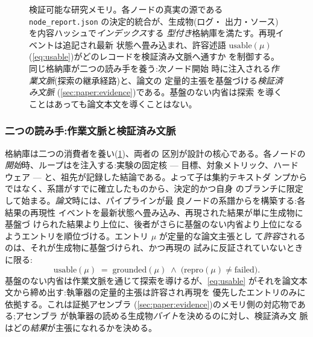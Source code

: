 \begin{figure}[t]
  \centering
  \resizebox{0.92\columnwidth}{!}{}
  \caption{検証可能な研究メモリ。各ノードの真実の源である
           \texttt{node\_report.json} の決定的統合が、生成物(ログ・
           出力・ソース)を内容ハッシュで\emph{インデックス}する
           \emph{型付き}格納庫を満たす。再現イベントは追記され最新
           状態へ畳み込まれ、許容述語 $\mathrm{usable}(\mu)$
           (\cref{eq:usable})がどのレコードを検証済み文脈へ通すか
           を制御する。同じ格納庫が二つの読み手を養う:次ノード開始
           時に注入される\emph{作業文脈}(探索の継承経路)と、論文の
           定量的主張を基盤づける\emph{検証済み文脈}
           (\cref{sec:paper:evidence})である。基盤のない内省は探索
           を導くことはあっても論文本文を導くことはない。}
  \label{fig:research-memory}
\end{figure}

\subsubsection*{二つの読み手:作業文脈と検証済み文脈}

格納庫は二つの消費者を養い(\cref{fig:research-memory})、両者の
区別が設計の核心である。各ノードの\emph{開始}時、ループはを注入する:実験の固定核 — 目標、対象メトリック、ハード
ウェア — と、祖先が記録した結論である。よって子は集約テキストダ
ンプからではなく、系譜がすでに確立したものから、決定的かつ自身
のブランチに限定して始まる。\emph{論文}時には、パイプラインが最
良ノードの系譜からを構築する:各結果の再現性
イベントを最新状態へ畳み込み、再現された結果が単に生成物に基盤づ
けられた結果より上位に、後者がさらに基盤のない内省より上位になる
ようエントリを順位づける。エントリ $\mu$ が定量的な論文主張とし
て\emph{許容}されるのは、それが生成物に基盤づけられ、かつ再現の
試みに反証されていないときに限る:
\begin{equation}\label{eq:usable}
  \mathrm{usable}(\mu) \;=\;
    \mathrm{grounded}(\mu)\;\wedge\;
    \bigl(\mathrm{repro}(\mu)\neq\mathrm{failed}\bigr).
\end{equation}
基盤のない内省は作業文脈を通じて探索を導けるが、\cref{eq:usable}
がそれを論文本文から締め出す:執筆器の定量的主張は許容され再現を
優先したエントリのみに依拠する。これは証拠アセンブラ
(\cref{sec:paper:evidence})のメモリ側の対応物である;アセンブラ
が執筆器の読める生成物\emph{バイト}を決めるのに対し、検証済み文
脈はどの\emph{結果}が主張になれるかを決める。


